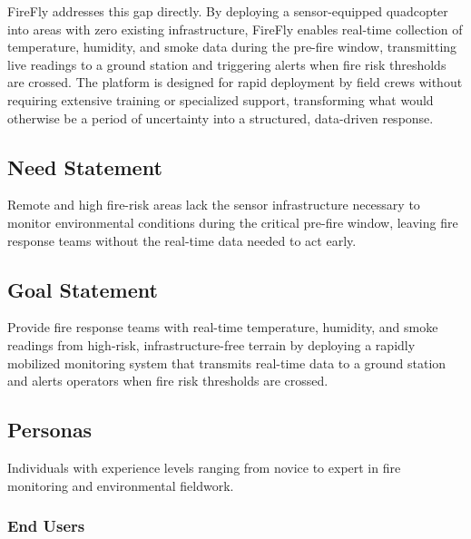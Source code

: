 \documentclass[journal, onecolumn]{IEEEtran}
\begin{document}
FireFly addresses this gap directly. By deploying a sensor-equipped quadcopter into areas with zero existing infrastructure, FireFly enables real-time collection of temperature, humidity, and smoke data during the pre-fire window, transmitting live readings to a ground station and triggering alerts when fire risk thresholds are crossed. The platform is designed for rapid deployment by field crews without requiring extensive training or specialized support, transforming what would otherwise be a period of uncertainty into a structured, data-driven response.

\subsection{Need Statement}
Remote and high fire-risk areas lack the sensor infrastructure necessary to monitor environmental conditions during the critical pre-fire window, leaving fire response teams without the real-time data needed to act early.

\subsection{Goal Statement}
Provide fire response teams with real-time temperature, humidity, and smoke readings from high-risk, infrastructure-free terrain by deploying a rapidly mobilized monitoring system that transmits real-time data to a ground station and alerts operators when fire risk thresholds are crossed.

\subsection{Personas}
Individuals with experience levels ranging from novice to expert in fire monitoring and environmental fieldwork.

\subsubsection*{End Users}
\end{document}
